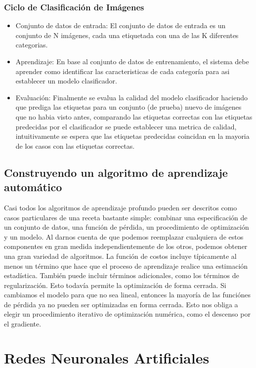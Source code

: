 \documentclass[a4paper,11pt,spanish]{book}
\begin{document}
	\subsubsection {Ciclo de Clasificación de Imágenes}
	  \begin{itemize}
	    \item Conjunto de datos de entrada: El conjunto de datos de entrada es un conjunto de N imágenes, cada una etiquetada con una de las K diferentes categorias.
	    \item Aprendizaje: En base al conjunto de datos de entrenamiento, el sistema debe aprender como identificar las caracteristicas de cada categoría para asi establecer un modelo clasificador.
	    \item Evaluación: Finalmente se evalua la calidad del modelo clasificador haciendo que prediga las etiquetas para un conjunto (de prueba) nuevo de imágenes que no habia visto antes, comparando las
	    etiquetas correctas con las etiquetas predecidas por el clasificador se puede establecer una metrica de calidad, intuitivamente se espera que las etiquetas predecidas coincidan en la mayoria
	    de los casos con las etiquetas correctas.
	  \end{itemize}
\fi 


    \subsection{Construyendo un algoritmo de aprendizaje automático}
      Casi todos los algoritmos de aprendizaje profundo pueden ser descritos como casos particulares de una receta bastante simple:
      combinar una especificación de un conjunto de datos, una función de pérdida, un procedimiento de optimización y un modelo.
      Al darnos cuenta de que podemos reemplazar cualquiera de estos componentes en gran medida independientemente de los otros, podemos obtener una gran variedad de algoritmos.
      La función de costos incluye típicamente al menos un término que hace que el proceso de aprendizaje realice una estimación estadística. También puede incluir términos adicionales,
      como los términos de regularización. Esto todavía permite la optimización de forma cerrada.
      Si cambiamos el modelo para que no sea lineal, entonces la mayoría de las funciónes de pérdida ya no pueden ser optimizadas en forma cerrada.
      Esto nos obliga a elegir un procedimiento iterativo de optimización numérica, como el descenso por el gradiente.

    \section{Redes Neuronales Artificiales}
\end{document}
